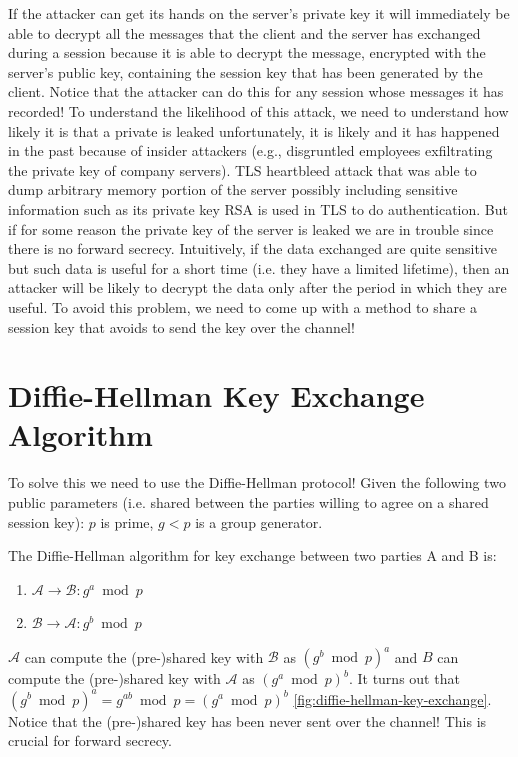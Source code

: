 If the attacker can get its hands on the server’s private key it will immediately be able to decrypt all the messages that the client and the server has exchanged during a session because it is able to decrypt the message, encrypted with the server’s public key, containing the session key that has been generated by the client. Notice that the attacker can do this for any session whose messages it has recorded!
To understand the likelihood of this attack, we need to understand how likely it is that a private is leaked unfortunately, it is likely and it has happened in the past because of insider attackers (e.g., disgruntled employees exfiltrating the private key of company servers). TLS heartbleed attack that was able to dump arbitrary memory portion of the server possibly including sensitive information such as its private key RSA is used in TLS to do authentication. But if for some reason the private key of the server is leaked we are in trouble since there is no forward secrecy.
Intuitively, if the data exchanged are quite sensitive but such data is useful for a short time (i.e. they have a limited lifetime), then an attacker will be likely to decrypt the data only after the period in which they are useful. To avoid this problem, we need to come up with a method to share a session key that avoids to send the key over the channel!

\section{Diffie-Hellman Key Exchange Algorithm}
To solve this we need to use the Diffie-Hellman protocol!
Given the following two public parameters (i.e. shared between the parties willing to agree on a shared session key): $p$ is prime, $g<p$ is a group generator.

The Diffie-Hellman algorithm for key exchange between two parties A and B is: 
\begin{enumerate}
	\item $\mathcal{A} \rightarrow \mathcal{B}: g^a \bmod{p}$
	\item $\mathcal{B} \rightarrow \mathcal{A}: g^b \bmod{p}$
\end{enumerate}

$\mathcal{A}$ can compute the (pre-)shared key with $\mathcal{B}$ as $(g^b \bmod{p})^a$ and $B$ can compute the (pre-)shared key with $\mathcal{A}$ as $(g^a \bmod{p})^b$.
It turns out that $(g^b \bmod{p})^a = g^{ab} \bmod{p} = (g^a \bmod{p})^b$ \ref{fig:diffie-hellman-key-exchange}.
Notice that the (pre-)shared key has been never sent over the channel! This is crucial for forward secrecy.


